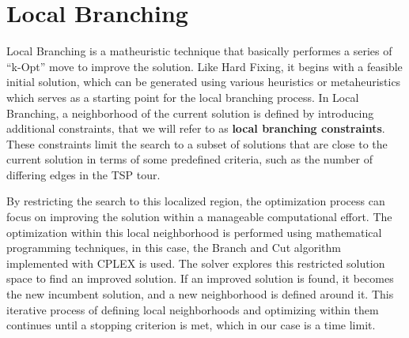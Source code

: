 \section{Local Branching}

Local Branching is a matheuristic technique that basically performes a series of “k-Opt” move to improve the solution.
Like Hard Fixing, it begins with a feasible initial solution, which can be generated using various heuristics or metaheuristics which serves as a starting point for the local branching process.
In Local Branching, a neighborhood of the current solution is defined by introducing additional constraints, that we will refer to as \textbf{local branching constraints}.
These constraints limit the search to a subset of solutions that are close to the current solution in terms of some predefined criteria, such as the number of differing edges in the TSP tour.

By restricting the search to this localized region, the optimization process can focus on improving the solution within a manageable computational effort.
The optimization within this local neighborhood is performed using mathematical programming techniques, in this case, the Branch and Cut algorithm implemented with CPLEX is used.
The solver explores this restricted solution space to find an improved solution.
If an improved solution is found, it becomes the new incumbent solution, and a new neighborhood is defined around it.
This iterative process of defining local neighborhoods and optimizing within them continues until a stopping criterion is met, which in our case is a time limit.


